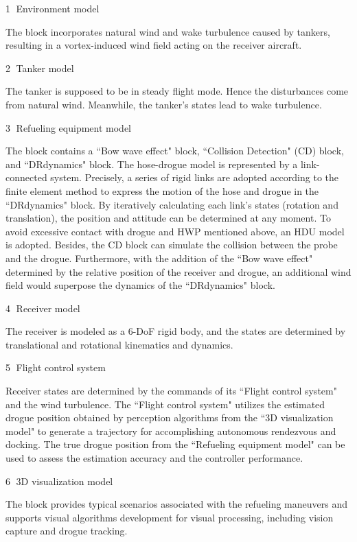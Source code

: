 \textcircled{1} Environment model

The block incorporates natural wind and wake turbulence caused by tankers, resulting in a vortex-induced wind field acting on the receiver aircraft. 

\textcircled{2} Tanker model

The tanker is supposed to be in steady flight mode. Hence the disturbances come from natural wind. Meanwhile, the tanker's states lead to wake turbulence.

\textcircled{3}	Refueling equipment model

The block contains a ``Bow wave effect" block, ``Collision Detection" (CD) block, and ``DRdynamics" block. The hose-drogue model is represented by a link-connected system. Precisely, a series of rigid links are adopted according to the finite element method to express the motion of the hose and drogue in the ``DRdynamics" block. By iteratively calculating each link's states (rotation and translation), the position and attitude can be determined at any moment. To avoid excessive contact with drogue and HWP mentioned above, an HDU model is adopted. Besides, the CD block can simulate the collision between the probe and the drogue. Furthermore, with the addition of the ``Bow wave effect" determined by the relative position of the receiver and drogue, an additional wind field would superpose the dynamics of the ``DRdynamics" block. 

\textcircled{4} Receiver model

The receiver is modeled as a 6-DoF rigid body, and the states are determined by translational and rotational kinematics and dynamics.

\textcircled{5}	Flight control system 

Receiver states are determined by the commands of its ``Flight control system" and the wind turbulence. The ``Flight control system" utilizes the estimated drogue position obtained by perception algorithms from the ``3D visualization model" to generate a trajectory for accomplishing autonomous rendezvous and docking. The true drogue position from the ``Refueling equipment model" can be used to assess the estimation accuracy and the controller performance.

\textcircled{6}	3D visualization model

The block provides typical scenarios associated with the refueling maneuvers and supports visual algorithms development for visual processing, including vision capture and drogue tracking.

